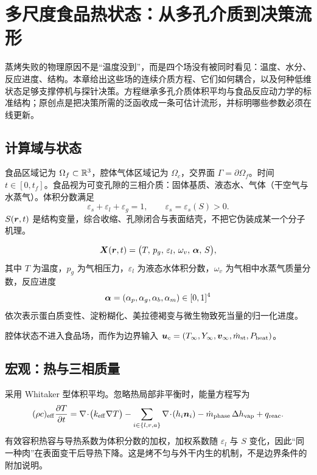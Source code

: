 \chapter{多尺度食品热状态：从多孔介质到决策流形}
\label{ch:physics}

蒸烤失败的物理原因不是“温度没到”，而是四个场没有被同时看见：温度、水分、反应进度、结构。本章给出这些场的连续介质方程、它们如何耦合，以及何种低维状态足够支撑停机与探针决策。方程继承多孔介质体积平均与食品反应动力学的标准结构；原创点是把决策所需的泛函收成一条可估计流形，并标明哪些参数必须在线更新。

\section{计算域与状态}

食品区域记为 $\Omega_f\subset\mathbb{R}^3$，腔体气体区域记为 $\Omega_c$，交界面 $\Gamma=\partial\Omega_f$。时间 $t\in[0,t_f]$。食品视为可变孔隙的三相介质：固体基质、液态水、气体（干空气与水蒸气）。体积分数满足
\begin{equation}
\varepsilon_s+\varepsilon_l+\varepsilon_g=1,\qquad \varepsilon_s=\varepsilon_s(S)>0.
\end{equation}
$S(\bm{r},t)$ 是结构变量，综合收缩、孔隙闭合与表面结壳，不把它伪装成某一个分子机理。

\begin{definition}[全场状态]
\label{def:fullstate}
\begin{equation}
\label{eq:state}
\bm{X}(\bm{r},t)=\big(T,\,p_g,\,\varepsilon_l,\,\omega_v,\,\bm{\alpha},\,S\big),
\end{equation}
其中 $T$ 为温度，$p_g$ 为气相压力，$\varepsilon_l$ 为液态水体积分数，$\omega_v$ 为气相中水蒸气质量分数，反应进度
\begin{equation}
\bm{\alpha}=(\alpha_p,\alpha_g,\alpha_b,\alpha_m)\in[0,1]^4
\end{equation}
依次表示蛋白质变性、淀粉糊化、美拉德褐变与微生物致死当量的归一化进度。
\end{definition}

腔体状态不进入食品场，而作为边界输入 $\bm{u}_c=(T_\infty,Y_\infty,\bm{v}_\infty,\dot m_{\mathrm{st}},P_{\mathrm{heat}})$。

\section{宏观：热与三相质量}

采用 Whitaker 型体积平均。忽略热局部非平衡时，能量方程写为
\begin{equation}
\label{eq:energy}
(\rho c)_{\mathrm{eff}}\frac{\partial T}{\partial t}
=\nabla\!\cdot\!\big(k_{\mathrm{eff}}\nabla T\big)
-\sum_{i\in\{l,v,a\}}\nabla\!\cdot\!(h_i\bm{n}_i)
-\dot m_{\mathrm{phase}}\,\Delta h_{\mathrm{vap}}
+q_{\mathrm{reac}}.
\end{equation}
有效容积热容与导热系数为体积分数的加权，加权系数随 $\varepsilon_l$ 与 $S$ 变化，因此“同一种肉”在表面变干后导热下降。这是烤不匀与外干内生的机制，不是边界条件的附加说明。

